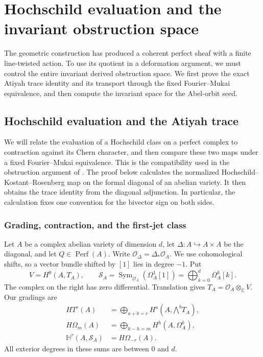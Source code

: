 \documentclass[11pt]{article}
\numberwithin{equation}{section}
\begin{document}
\section{Hochschild evaluation and the invariant obstruction space}
\label{p3:sec:obstruction}

The geometric construction has produced a coherent perfect sheaf with a
finite line-twisted action. To use its quotient in a deformation argument,
we must control the entire invariant derived obstruction space. We first
prove the exact Atiyah trace identity and its transport through the fixed
Fourier--Mukai equivalence, and then compute the invariant space for the
Abel-orbit seed.

\subsection{Hochschild evaluation and the Atiyah trace}
\label{p3sw:hh-evaluation}

We will relate the evaluation of a Hochschild class on a perfect
complex to contraction against its Chern character, and then compare
these two maps under a fixed Fourier--Mukai equivalence.  This is the
compatibility used in the obstruction argument of
\cite[Diagram~(8.3.4) and Lemma~8.3.10]{Markman2025Secant}.
The proof below calculates the normalized Hochschild--Kostant--Rosenberg
map on the formal diagonal of an abelian variety.  It then obtains the
trace identity from the diagonal adjunction.  In particular, the
calculation fixes one convention for the bivector sign on both sides.

\subsubsection{Grading, contraction, and the first-jet class}

Let \(A\) be a complex abelian variety of dimension \(d\), let
\(\Delta:A\hookrightarrow A\times A\) be the diagonal, and let
\(Q\in\operatorname{Perf}(A)\).  Write
\(\mathcal O_\Delta=\Delta_*\mathcal O_A\).  We use cohomological shifts, so a
vector bundle shifted by \([1]\) lies in degree \(-1\).  Put
\[
 V=H^0(A,T_A),\qquad
 \mathcal S_A=\operatorname{Sym}_{\mathcal O_A}(\Omega_A^1[1])
       =\bigoplus_{k=0}^d\Omega_A^k[k].
\]
The complex on the right has zero differential.  Translation gives
\(T_A=\mathcal O_A\otimes_{\mathbb C}V\).  Our gradings are
\begin{equation}
\begin{split}
 HT^r(A)&=\bigoplus_{a+b=r}H^a(A,\mathord{\bigwedge}^bT_A),\\
 H\Omega_m(A)&=\bigoplus_{k-h=m}H^h(A,\Omega_A^k),\\
 \mathbb H^r(A,\mathcal S_A)&=H\Omega_{-r}(A).
\end{split}
\label{p3sw:hh-eq:gradings}
\end{equation}
All exterior degrees in these sums are between \(0\) and \(d\).
\end{document}
